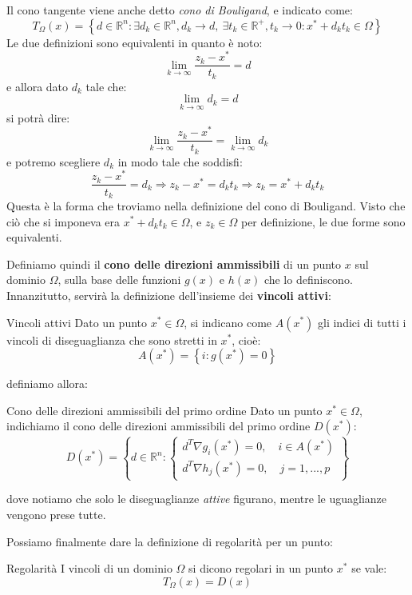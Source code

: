 \documentclass[a4paper,11pt]{article}
\begin{document}
\begin{itemize}
Il cono tangente viene anche detto \textit{cono di Bouligand}, e indicato come:
$$
T_\Omega(x) = \left\{ d \in \mathbb{R}^n : \exists d_k \in \mathbb{R}^n, d_k \rightarrow d, \ \exists t_k \in \mathbb{R}^+, t_k \rightarrow 0 : x^* + d_k t_k \in \Omega \right\}
$$
Le due definizioni sono equivalenti in quanto è noto:
$$
\lim_{k \rightarrow \infty} \frac{z_k - x^*}{t_k} = d
$$
e allora dato $d_k$ tale che:
$$
\lim_{k \rightarrow \infty} d_k = d
$$
si potrà dire:
$$
\lim_{k \rightarrow \infty} \frac{z_k - x^*}{t_k} = \lim_{k \rightarrow \infty} d_k 
$$
e potremo scegliere $d_k$ in modo tale che soddisfi:
$$
\frac{z_k - x^*}{t_k} = d_k \Rightarrow z_k - x^* = d_k t_k \Rightarrow z_k = x^* + d_k t_k
$$
Questa è la forma che troviamo nella definizione del cono di Bouligand.
Visto che ciò che si imponeva era $x^* + d_k t_k \in \Omega$, e $z_k \in \Omega$ per definizione, le due forme sono equivalenti.

\par\smallskip

Definiamo quindi il \textbf{cono delle direzioni ammissibili} di un punto $x$ sul dominio $\Omega$, sulla base delle funzioni $g(x)$ e $h(x)$ che lo definiscono.
Innanzitutto, servirà la definizione dell'insieme dei \textbf{vincoli attivi}:
\begin{definition}{Vincoli attivi}
	Dato un punto $x^* \in \Omega$, si indicano come $A(x^*)$ gli indici di tutti i vincoli di diseguaglianza che sono stretti in $x^*$, cioè:
	$$
		A(x^*) = \left\{ i : g(x^*) = 0 \right\}
	$$
\end{definition}
definiamo allora:
\begin{definition}{Cono delle direzioni ammissibili del primo ordine}
	Dato un punto $x^* \in \Omega$, indichiamo il cono delle direzioni ammissibili del primo ordine $D(x^*)$:
	$$
	D(x^*) = \left\{
			d \in \mathbb{R}^n : 	
			\begin{cases}
				d^T \nabla g_i(x^*) = 0, \quad i \in A(x^*) \\ 
				d^T \nabla h_j(x^*) = 0, \quad j = 1, ..., p
			\end{cases}
		\right\}
	$$
\end{definition}
dove notiamo che solo le diseguaglianze \textit{attive} figurano, mentre le uguaglianze vengono prese tutte.

Possiamo finalmente dare la definizione di regolarità per un punto:
\begin{definition}{Regolarità}
	I vincoli di un dominio $\Omega$ si dicono regolari in un punto $x^*$ se vale:
	$$
		T_\Omega(x) = D(x)
	$$
\end{definition}


\end{itemize}
\end{document}
